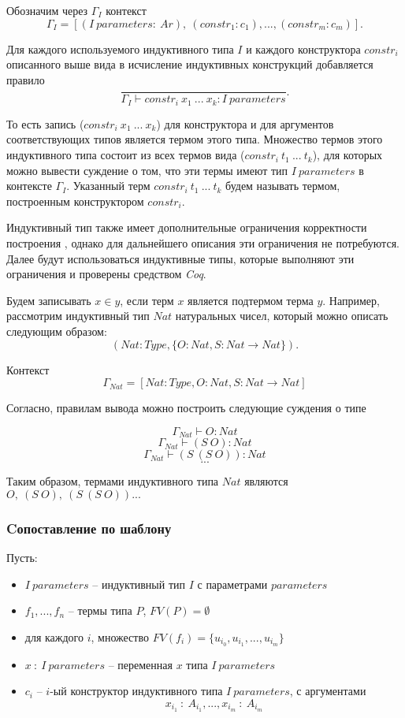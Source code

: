 \documentclass[12pt]{article}
\begin{document}
Обозначим через $\Gamma_I$ контекст $$\Gamma_I = [(I\ parameters:\ Ar),\ (constr_1: c_1),...,(constr_m: c_m)].$$

Для каждого используемого индуктивного типа $I$ и каждого конструктора $constr_i$ описанного выше вида в исчисление индуктивных конструкций добавляется правило
$$ \frac{}{\Gamma_I \vdash constr_i\ x_1\ ...\ x_k : I\ parameters}.$$

То есть запись ($constr_i\ x_1\ ...\ x_k$) для конструктора и для аргументов соответствующих типов является термом этого типа.
Множество термов этого индуктивного типа состоит из всех термов вида ($constr_i\ t_1\ ...\ t_k$), для которых можно вывести суждение о том, что эти термы имеют тип $I\ parameters$ в контексте $\Gamma_I$.
Указанный терм $constr_i\ t_1\ ...\ t_k$ будем называть термом, построенным конструктором $constr_i$.

Индуктивный тип также имеет дополнительные ограничения корректности построения \cite{CIC}, однако для дальнейшего описания эти ограничения не потребуются. Далее будут использоваться индуктивные типы, которые выполняют эти ограничения и проверены средством \textit{Coq}.

Будем записывать $x \in y$, если терм $x$ является подтермом терма $y$.
Например, рассмотрим индуктивный тип $Nat$ натуральных чисел, который можно описать следующим образом:
$$(Nat:Type, \{O: Nat, S: Nat \xrightarrow{} Nat\}).$$

Контекст $$\Gamma_{Nat} = [Nat:Type, O:Nat, S:Nat \xrightarrow{} Nat] $$

Согласно, правилам вывода можно построить следующие суждения о типе

$$\Gamma_{Nat} \vdash O: Nat$$
$$\Gamma_{Nat} \vdash (S\ O): Nat$$
$$\Gamma_{Nat} \vdash (S\ (S\ O)): Nat$$
$$...$$

Таким образом, термами индуктивного типа $Nat$ являются $O,\ (S\ O),\ (S\ (S\ O))...$ 

\subsubsection{Cопоставление по шаблону}
Пусть:
\begin{itemize}
    \item $I\ parameters$ -- индуктивный тип $I$ с параметрами $parameters$
    \item $f_1,...,f_n$ -- термы типа $P$, $FV(P) = \emptyset $
    \item для каждого $i$, множество $FV(f_i)=\{u_{i_0}, u_{i_1}, ... , u_{i_m}\}$
    \item $x\ :\ I\ parameters$ -- переменная $x$ типа $I\ parameters$
    \item $c_i$ -- $i$-ый конструктор индуктивного типа $I\ parameters$, с аргументами $$x_{i_1}\ :\ A_{i_1}, ..., x_{i_m}\ :\ A_{i_m}$$
\end{itemize}
\end{document}
